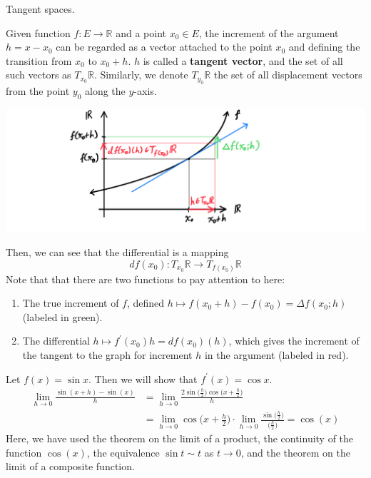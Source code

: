   Tangent spaces. 

  \begin{definition}
    Given function $f: E \longrightarrow \mathbb{R}$ and a point $x_0 \in E$, the increment of the argument $h = x - x_0$ can be regarded as a vector attached to the point $x_0$ and defining the transition from $x_0$ to $x_0 + h$. $h$ is called a \textbf{tangent vector}, and the set of all such vectors as $T_{x_0} \mathbb{R}$. Similarly, we denote $T_{y_0} \mathbb{R}$ the set of all displacement vectors from the point $y_0$ along the $y$-axis. 
    \begin{center}
        \includegraphics[scale=0.25]{img/Tangent_Space_1_dimensional_in_R.PNG}
    \end{center}
    Then, we can see that the differential is a mapping
    \[df(x_0): T_{x_0} \mathbb{R} \longrightarrow T_{f(x_0)} \mathbb{R}\]
    Note that that there are two functions to pay attention to here: 
    \begin{enumerate}
      \item The true increment of $f$, defined $h \mapsto f(x_0 + h) - f(x_0) = \Delta f(x_0; h)$ (labeled in green). 
      \item The differential $h \mapsto f^\prime (x_0) h = df(x_0) (h)$, which gives the increment of the tangent to the graph for increment $h$ in the argument (labeled in red). 
    \end{enumerate}
  \end{definition}

  \begin{example}
    Let $f(x) = \sin{x}$. Then we will show that $f^\prime (x) = \cos{x}$. 
    \begin{align*}
        \lim_{h \rightarrow 0} \frac{\sin{(x+h)} - \sin(x)}{h} & = \lim_{h \rightarrow 0} \frac{2 \sin \big( \frac{h}{2} \big) \cos \big( x + \frac{h}{2} \big)}{h} \\
        & = \lim_{h \rightarrow 0} \cos \Big( x + \frac{h}{2} \Big) \cdot \lim_{h\rightarrow 0} \frac{\sin\big( \frac{h}{2}\big)}{\big(\frac{h}{2}\big)} = \cos(x)
    \end{align*}
    Here, we have used the theorem on the limit of a product, the continuity of the function $\cos(x)$, the equivalence $\sin{t} \sim t$ as $t \rightarrow 0$, and the theorem on the limit of a composite function. 
  \end{example}

